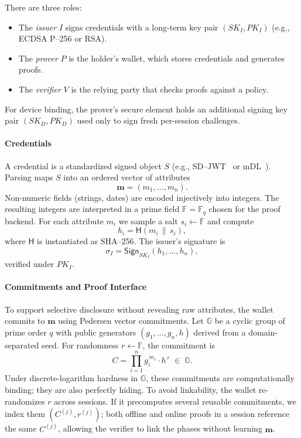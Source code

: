There are three roles:
\begin{itemize}
  \item The \emph{issuer} $I$ signs credentials with a long-term key pair $(SK_I,PK_I)$ (e.g., ECDSA P--256 or RSA).
  \item The \emph{prover} $P$ is the holder’s wallet, which stores credentials and generates proofs. 
  \item The \emph{verifier} $V$ is the relying party that checks proofs against a policy.
\end{itemize}
For device binding, the prover’s secure element holds an additional signing key pair $(SK_D,PK_D)$ used only to sign fresh per-session challenges.

\paragraph{Credentials}
A credential is a standardized signed object $S$ (e.g., SD--JWT~\cite{IETF:FetYasCam25} or mDL~\cite{ISO:18013-5}). 
Parsing maps $S$ into an ordered vector of attributes
\[
  \mathbf{m}=(m_1,\ldots,m_n).
\]
Non-numeric fields (strings, dates) are encoded injectively into integers. 
The resulting integers are interpreted in a prime field $\mathbb{F}=\mathbb{F}_q$ chosen for the proof backend. 
For each attribute $m_i$ we sample a salt $s_i \leftarrow \mathbb{F}$ and compute
\[
  h_i = \mathsf{H}(m_i \,\|\, s_i),
\]
where $\mathsf{H}$ is instantiated as SHA--256. 
The issuer’s signature is
\[
  \sigma_I = \mathsf{Sign}_{SK_I}(h_1,\ldots,h_n),
\]
verified under $PK_I$.

\paragraph{Commitments and Proof Interface}
To support selective disclosure without revealing raw attributes, the wallet commits to $\mathbf{m}$ using Pedersen vector commitments. 
Let $\mathbb{G}$ be a cyclic group of prime order $q$ with public generators $(g_1,\ldots,g_n,h)$ derived from a domain-separated seed. 
For randomness $r \leftarrow \mathbb{F}$, the commitment is
\[
  C = \prod_{i=1}^n g_i^{\,m_i}\cdot h^{\,r}\;\in\;\mathbb{G}.
\]
Under discrete-logarithm hardness in $\mathbb{G}$, these commitments are computationally binding; they are also perfectly hiding. 
To avoid linkability, the wallet re-randomizes $r$ across sessions. 
If it precomputes several reusable commitments, we index them $(C^{(j)},r^{(j)})$; both offline and online proofs in a session reference the same $C^{(j)}$, allowing the verifier to link the phases without learning $\mathbf{m}$.

